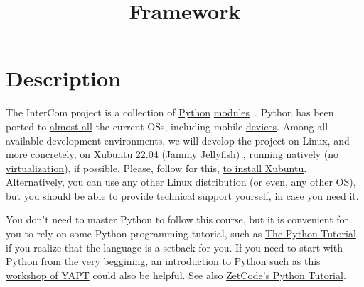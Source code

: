
\title{Framework}

\maketitle

\section{Description}

The InterCom project \cite{intercom} is a collection of
\href{https://www.python.org/}{Python}
\href{https://docs.python.org/3/tutorial/modules.html#modules}{modules}~\cite{python}.
Python has been ported to
\href{https://www.python.org/download/other/}{almost all} the current
OSs, including mobile \href{https://kivy.org/#home}{devices}. Among
all available development environments, we will develop the project on
Linux, and more concretely, on
\href{https://xubuntu.org/download/}{Xubuntu 22.04 (Jammy Jellyfish)}
\cite{xubuntu}, running natively (no
\href{https://en.wikipedia.org/wiki/Virtualization}{virtualization}),
if possible. Please, follow for this,
\href{https://vicente-gonzalez-ruiz.github.io/Xubuntu_install/}{to
  install Xubuntu}. Alternatively, you can use any other Linux
distribution (or even, any other OS), but you should be able to
provide technical support yourself, in case you need it.

You don't need to master Python to follow this course, but it is
convenient for you to rely on some Python programming tutorial, such
as \href{https://docs.python.org/3/tutorial/}{The Python Tutorial}
\cite{python-tutorial} if you realize that the language is a setback
for you. If you need to start with Python from the very beggining, an
introduction to Python such as this
\href{https://github.com/vicente-gonzalez-ruiz/YAPT/tree/master/workshops/programacion_python_ESO}{workshop
  of YAPT} \cite{YAPT} could also be helpful. See also
\href{http://zetcode.com/lang/python/}{ZetCode's Python
  Tutorial}.

